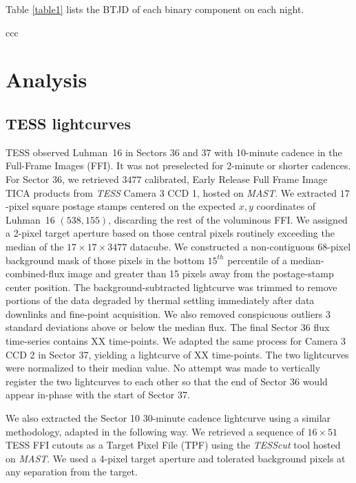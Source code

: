 \documentclass[modern]{aastex631}
\begin{document}
Table \ref{table1} lists the BTJD of each binary component on each night.

\begin{deluxetable}{ccc}
  \startdata
  
  \enddata

\end{deluxetable}

\section{Analysis}

\subsection{TESS lightcurves}

TESS observed Luhman~16 in Sectors 36 and 37 with 10-minute cadence in the Full-Frame Images (FFI).  It was not preselected for 2-minute or shorter cadences.  For Sector 36, we retrieved $3477$ calibrated, Early Release Full Frame Image TICA products \citep{2020RNAAS...4..251F} from \emph {TESS} Camera 3 CCD 1, hosted on \emph{MAST}.  We extracted $17$-pixel square postage stamps centered on the expected $x,y$ coordinates of Luhman~16 $(538, 155)$, discarding the rest of the voluminous FFI.  We assigned a 2-pixel target aperture based on those central pixels routinely exceeding the median of the $17\times17\times3477$ datacube. We constructed a non-contiguous 68-pixel background mask of those pixels in the bottom $15^{th}$ percentile of a median-combined-flux image and greater than 15 pixels away from the postage-stamp center position. The background-subtracted lightcurve was trimmed to remove portions of the data degraded by thermal settling immediately after data downlinks and fine-point acquisition.  We also removed conspicuous outliers 3 standard deviations above or below the median flux.  The final Sector 36 flux time-series contains XX time-points.  We adapted the same process for Camera 3 CCD 2 in Sector 37, yielding a lightcurve of XX time-points.  The two lightcurves were normalized to their median value.  No attempt was made to vertically register the two lightcurves to each other so that the end of Sector 36 would appear in-phase with the start of Sector 37.

We also extracted the Sector 10 30-minute cadence lightcurve using a similar methodology, adapted in the following way.  We retrieved a sequence of $16\times51$ TESS FFI cutouts as a Target Pixel File (TPF) using the \emph{TESScut} tool hosted on \emph{MAST}.  We used a 4-pixel target aperture and tolerated background pixels at any separation from the target.
\end{document}
